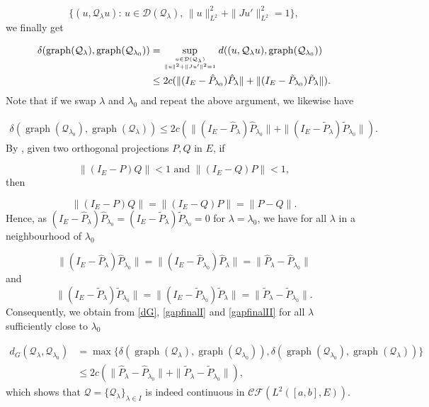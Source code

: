 \documentclass[a4paper,10pt]{article}
\DeclareMathOperator{\gra}{graph}
\begin{document}
\[\{(u,\mathcal{Q}_\lambda u):\, u\in\mathcal{D}(\mathcal{Q}_\lambda),\, \|u\|^2_{L^2}+\|Ju'\|^2_{L^2}=1\},\]
we finally get

\begin{align}\label{gapfinalI}
\begin{split}
\delta(\gra(\mathcal{Q}_\lambda),\gra(\mathcal{Q}_{\lambda_0}))&=\sup_{{{u\in\mathcal{D}(\mathcal{Q}_\lambda)}\atop{\|u\|^2+\|Ju'\|^2=1}}}d((u,\mathcal{Q}_\lambda u),\gra(\mathcal{Q}_{\lambda_0}))\\
&\leq 2c(\|(I_E-\hat{P}_{\lambda_0})\hat{P}_\lambda\|+\|(I_E-\tilde{P}_{\lambda_0})\tilde{P}_\lambda\|).
\end{split}
\end{align}
Note that if we swap $\lambda$ and $\lambda_0$ and repeat the above argument, we likewise have

\begin{align}\label{gapfinalII}
\delta(\gra(\mathcal{Q}_{\lambda_0}),\gra(\mathcal{Q}_{\lambda}))\leq 2c(\|(I_E-\hat{P}_{\lambda})\hat{P}_{\lambda_0}\|+\|(I_E-\tilde{P}_{\lambda})\tilde{P}_{\lambda_0}\|).
\end{align}
By \cite[I.6.34]{Kato}, given two orthogonal projections $P,Q$ in $E$, if 

\[\|(I_E-P)Q\|<1\,\,\text{and  } \|(I_E-Q)P\|<1,\]
then 

\[\|(I_E-P)Q\|=\|(I_E-Q)P\|=\|P-Q\|.\]
Hence, as $(I_E-\hat{P}_{\lambda})\hat{P}_{\lambda_0}=(I_E-\tilde{P}_{\lambda})\tilde{P}_{\lambda_0}=0$ for $\lambda=\lambda_0$, we have for all $\lambda$ in a neighbourhood of $\lambda_0$

\[\|(I_E-\hat{P}_{\lambda})\hat{P}_{\lambda_0}\|=\|(I_E-\hat{P}_{\lambda_0})\hat{P}_{\lambda}\|=\|\hat{P}_{\lambda}-\hat{P}_{\lambda_0}\|\]
and
\[\|(I_E-\tilde{P}_{\lambda})\tilde{P}_{\lambda_0}\|=\|(I_E-\tilde{P}_{\lambda_0})\tilde{P}_{\lambda}\|=\|\tilde{P}_\lambda-\tilde{P}_{\lambda_0}\|.\]
Consequently, we obtain from \eqref{dG}, \eqref{gapfinalI} and \eqref{gapfinalII} for all $\lambda$ sufficiently close to $\lambda_0$

\begin{align*}
d_G(\mathcal{Q}_\lambda,\mathcal{Q}_{\lambda_0})&=\max\{\delta(\gra(\mathcal{Q}_\lambda),\gra(\mathcal{Q}_{\lambda_0})),\delta(\gra(\mathcal{Q}_{\lambda_0}),\gra(\mathcal{Q}_{\lambda}))\}\\
&\leq 2c(\|\hat{P}_\lambda-\hat{P}_{\lambda_0}\|+\|\tilde{P}_\lambda-\tilde{P}_{\lambda_0}\|),
\end{align*}
which shows that $\mathcal{Q}=\{\mathcal{Q}_\lambda\}_{\lambda\in I}$ is indeed continuous in $\mathcal{CF}(L^2([a,b],E))$.
\end{document}
